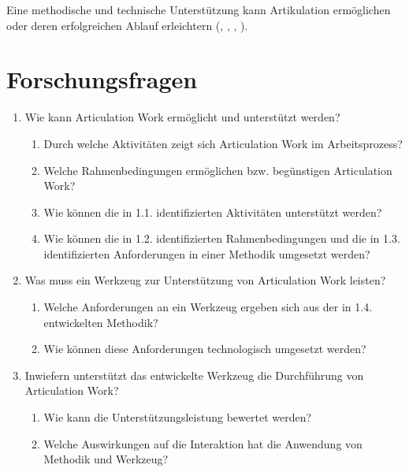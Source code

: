 Eine methodische und technische Unterstützung kann Artikulation ermöglichen oder deren erfolgreichen Ablauf erleichtern (\cite{Schmidt92}, \cite{Simone99}, \cite{Jorgensen04}, \cite{Baker07}).


\section{Forschungsfragen} %
\label{sec:forschungsfragen}

\begin{enumerate}
	\item Wie kann Articulation Work ermöglicht und unterstützt werden?
		\begin{enumerate}
			\item Durch welche Aktivitäten zeigt sich Articulation Work im Arbeitsprozess?
			\item Welche Rahmenbedingungen ermöglichen bzw. begünstigen Articulation Work?
			\item Wie können die in 1.1. identifizierten Aktivitäten unterstützt werden?
			\item Wie können die in 1.2. identifizierten Rahmenbedingungen und die in 1.3. identifizierten Anforderungen in einer Methodik umgesetzt werden?
		\end{enumerate}
	\item Was muss ein Werkzeug zur Unterstützung von Articulation Work leisten?
		\begin{enumerate}
			\item Welche Anforderungen an ein Werkzeug ergeben sich aus der in 1.4. entwickelten Methodik?
			\item Wie können diese Anforderungen technologisch umgesetzt werden?
		\end{enumerate}
	\item Inwiefern unterstützt das entwickelte Werkzeug die Durchführung von Articulation Work?
		\begin{enumerate}
			\item Wie kann die Unterstützungsleistung bewertet werden?
			\item Welche Auswirkungen auf die Interaktion hat die Anwendung von Methodik und Werkzeug?
		\end{enumerate}
\end{enumerate}


